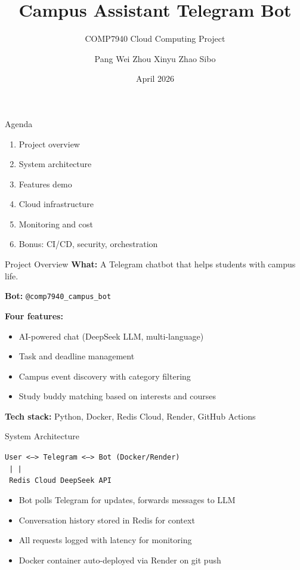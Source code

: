 \documentclass[aspectratio=169,11pt]{beamer}
\title{Campus Assistant Telegram Bot}
\subtitle{COMP7940 Cloud Computing Project}
\author{Pang Wei \quad Zhou Xinyu \quad Zhao Sibo}
\institute{Hong Kong Baptist University}
\date{April 2026}
\begin{document}
\begin{frame}
\titlepage
\end{frame}

\begin{frame}{Agenda}
\begin{enumerate}
\item Project overview
\item System architecture
\item Features demo
\item Cloud infrastructure
\item Monitoring and cost
\item Bonus: CI/CD, security, orchestration
\end{enumerate}
\end{frame}

\begin{frame}{Project Overview}
\textbf{What:} A Telegram chatbot that helps students with campus life.

\textbf{Bot:} \texttt{@comp7940\_campus\_bot}

\vspace{0.3cm}
\textbf{Four features:}
\begin{itemize}
\item AI-powered chat (DeepSeek LLM, multi-language)
\item Task and deadline management
\item Campus event discovery with category filtering
\item Study buddy matching based on interests and courses
\end{itemize}

\vspace{0.3cm}
\textbf{Tech stack:} Python, Docker, Redis Cloud, Render, GitHub Actions
\end{frame}

\begin{frame}[fragile]{System Architecture}
\begin{center}
\texttt{User <--> Telegram <--> Bot (Docker/Render)} \\
\texttt{\hspace{4cm} | \hspace{1.5cm} |} \\
\texttt{\hspace{3cm} Redis Cloud \hspace{0.3cm} DeepSeek API}
\end{center}

\vspace{0.3cm}
\begin{itemize}
\item Bot polls Telegram for updates, forwards messages to LLM
\item Conversation history stored in Redis for context
\item All requests logged with latency for monitoring
\item Docker container auto-deployed via Render on git push
\end{itemize}
\end{frame}
\end{document}
